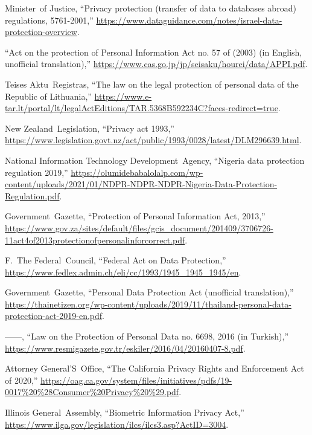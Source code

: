 \documentclass[journal]{IEEEtran}
\begin{document}
\begin{thebibliography}{100}
\relax Minister~of Justice, ``Privacy protection (transfer of data to databases
  abroad) regulations, 5761-2001,''
  \url{https://www.dataguidance.com/notes/israel-data-protection-overview}.

``Act on the protection of Personal Information Act no. 57 of (2003) (in
  English, unofficial translation),''
  \url{https://www.cas.go.jp/jp/seisaku/hourei/data/APPI.pdf}.

\relax Teises Aktu~Registras, ``The law on the legal protection of personal data of
  the Republic of Lithuania,''
  \url{https://www.e-tar.lt/portal/lt/legalActEditions/TAR.5368B592234C?faces-redirect=true}.

\relax New Zealand~Legislation, ``Privacy act 1993,''
  \url{https://www.legislation.govt.nz/act/public/1993/0028/latest/DLM296639.html}.

\relax National Information Technology Development~Agency, ``Nigeria data
  protection regulation 2019,''
  \url{https://olumidebabalolalp.com/wp-content/uploads/2021/01/NDPR-NDPR-NDPR-Nigeria-Data-Protection-Regulation.pdf}.

\relax Government~Gazette, ``Protection of Personal Information Act, 2013,''
  \url{https://www.gov.za/sites/default/files/gcis_document/201409/3706726-11act4of2013protectionofpersonalinforcorrect.pdf}.

F.~\relax The Federal~Council, ``Federal Act on Data Protection,''
  \url{https://www.fedlex.admin.ch/eli/cc/1993/1945_1945_1945/en}.

\relax Government~Gazette, ``Personal Data Protection Act (unofficial
  translation),''
  \url{https://thainetizen.org/wp-content/uploads/2019/11/thailand-personal-data-protection-act-2019-en.pdf}.

------, ``Law on the Protection of Personal Data no. 6698, 2016 (in Turkish),''
  \url{https://www.resmigazete.gov.tr/eskiler/2016/04/20160407-8.pdf}.

\relax Attorney General'S~Office, ``The California Privacy Rights and
  Enforcement Act of 2020,''
  \url{https://oag.ca.gov/system/files/initiatives/pdfs/19-0017\%20\%28Consumer\%20Privacy\%20\%29.pdf}.

\relax Illinois General~Assembly, ``Biometric Information Privacy Act,''
  \url{https://www.ilga.gov/legislation/ilcs/ilcs3.asp?ActID=3004}.


\end{thebibliography}
\end{document}
